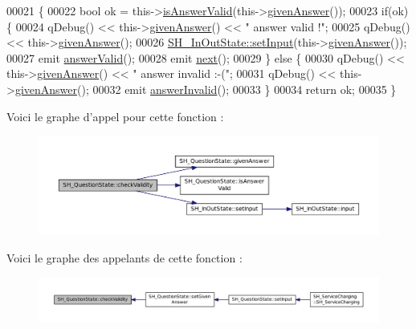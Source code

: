 \begin{DoxyCode}
00021 \{
00022     \textcolor{keywordtype}{bool} ok = this->\hyperlink{classSH__QuestionState_ac195d7ad87a52ab276a7c4a902eab691}{isAnswerValid}(this->\hyperlink{classSH__QuestionState_abde97c61175be95358ece622fd16593e}{givenAnswer}());
00023     \textcolor{keywordflow}{if}(ok) \{
00024         qDebug() << this->\hyperlink{classSH__QuestionState_abde97c61175be95358ece622fd16593e}{givenAnswer}() << \textcolor{stringliteral}{" answer valid !"};
00025         qDebug() << this->\hyperlink{classSH__QuestionState_abde97c61175be95358ece622fd16593e}{givenAnswer}();
00026         \hyperlink{classSH__InOutState_a0206ab7d5616f28b0da7bfd5451614e8}{SH\_InOutState::setInput}(this->\hyperlink{classSH__QuestionState_abde97c61175be95358ece622fd16593e}{givenAnswer}());
00027         emit \hyperlink{classSH__QuestionState_a04e259643788d15ab6244bc8a04286d6}{answerValid}();
00028         emit \hyperlink{classSH__GenericState_a030e67a872956135c52e6876d960a7b5}{next}();
00029     \} \textcolor{keywordflow}{else} \{
00030         qDebug() << this->\hyperlink{classSH__QuestionState_abde97c61175be95358ece622fd16593e}{givenAnswer}() << \textcolor{stringliteral}{" answer invalid :-("};
00031         qDebug() << this->\hyperlink{classSH__QuestionState_abde97c61175be95358ece622fd16593e}{givenAnswer}();
00032         emit \hyperlink{classSH__QuestionState_a3348a8a683130678ac87a10ba2a25486}{answerInvalid}();
00033     \}
00034     \textcolor{keywordflow}{return} ok;
00035 \}
\end{DoxyCode}


Voici le graphe d'appel pour cette fonction \-:
\nopagebreak
\begin{figure}[H]
\begin{center}
\leavevmode
\includegraphics[width=350pt]{classSH__QuestionState_a3ca5459c20ef591023c0572d8224146c_cgraph}
\end{center}
\end{figure}




Voici le graphe des appelants de cette fonction \-:
\nopagebreak
\begin{figure}[H]
\begin{center}
\leavevmode
\includegraphics[width=350pt]{classSH__QuestionState_a3ca5459c20ef591023c0572d8224146c_icgraph}
\end{center}
\end{figure}


